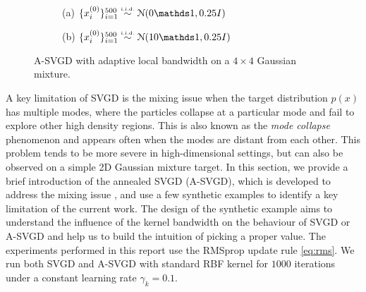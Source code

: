 \captionsetup[subfigure]{labelformat=empty}
\begin{figure}[t!]
    \centering 
\begin{subfigure}[b]{.48\textwidth} 
    \caption{(a) $\{x_i^{(0)}\}_{i = 1}^{500} \distiid \distNorm(0\ind, 0.25I)$  \label{fig:bwlocal}}
\end{subfigure}
\hfill
\centering
\begin{subfigure}[b]{0.48\textwidth}
    \caption{(b) $\{x_i^{(0)}\}_{i = 1}^{500} \distiid \distNorm(10\ind, 0.25I)$ \label{fig:slicelocal}}
\end{subfigure}

\caption{A-SVGD with adaptive local bandwidth on a $4 \times 4$ Gaussian mixture.}
\label{fig:gridlocal}
\end{figure}

A key limitation of SVGD is the mixing issue when the target
distribution $p(x)$ has multiple modes, where the
particles collapse at a particular mode and fail
to explore other high density regions. This is also known
as the \emph{mode collapse} phenomenon \citep{zhuo2018message,d2021annealed}
and appears often when the modes are distant from each other. This problem tends to be more severe in high-dimensional settings, but can
also be observed on a simple 2D Gaussian mixture target. 
In this section, we provide a brief introduction of the annealed SVGD
(A-SVGD), which is developed to address the mixing issue
\citep{d2021annealed}, and use a few synthetic examples to identify a key
limitation of the current work. The design of the synthetic example aims to
understand the influence of the kernel bandwidth on the behaviour of SVGD or
A-SVGD and help us to build the intuition of picking a proper value. The
experiments performed in this report use the RMSprop update rule
\cref{eq:rms}. We run both SVGD and A-SVGD with standard RBF kernel for
$1000$ iterations under a constant learning rate $\gamma_k = 0.1$.



